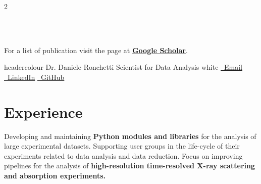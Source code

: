 \documentclass[lighthipster]{simplehipstercv}
\begin{document}
\begin{paracol}{2}
{ \\[0.5em]
\noindent{}
\bigskip

 \\[0.5em]
For a list of publication visit the page at \href{https://scholar.google.com/citations?user=GPGZ9PQAAAAJ&hl=en}{\textbf{Google Scholar}}.


\vfill
\phantom{turn the page}
\phantom{turn the page}
}
    

\switchcolumn


\simpleheader
{headercolour}
{Dr. Daniele}
{Ronchetti}
{Scientist for Data Analysis}
{white}
{
    \href{mailto:daniele.ronchetti@outlook.it}{\faEnvelopeO\ Email}
    \quad
    \href{https://www.linkedin.com/in/daniele-ronchetti/}{\faLinkedin\ LinkedIn}
    \quad
    \href{https://github.com/Lt-Tentennante}{\faGithub\ GitHub}
}

\vspace{10em}

\small
\section*{Experience}

{
Developing and maintaining \textbf{Python modules and libraries} for the analysis of large experimental datasets. Supporting user groups in the life-cycle of their experiments related to data analysis and data reduction. Focus on improving pipelines for the analysis of \textbf{high-resolution time-resolved X-ray scattering and absorption experiments.}
}


\end{paracol}
\end{document}
